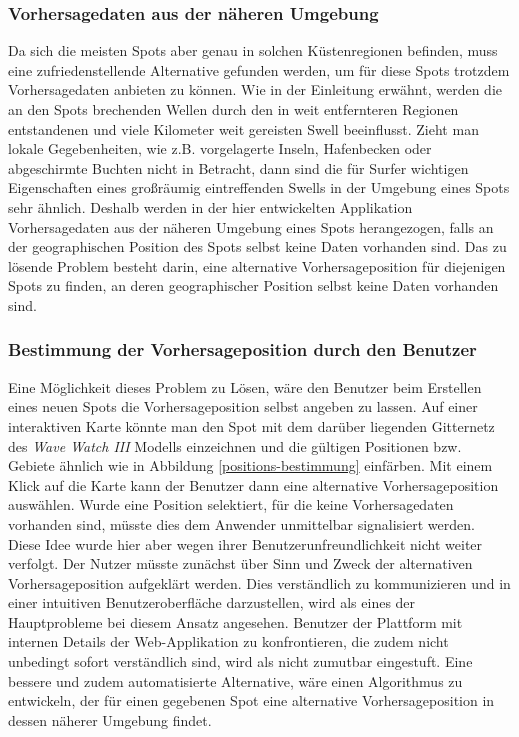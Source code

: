 \subsubsection{Vorhersagedaten aus der näheren Umgebung}
Da sich die meisten Spots aber genau in solchen Küstenregionen
befinden, muss eine zufriedenstellende Alternative gefunden werden, um
für diese Spots trotzdem Vorhersagedaten anbieten zu können. Wie in
der Einleitung erwähnt, werden die an den Spots brechenden Wellen
durch den in weit entfernteren Regionen entstandenen und viele
Kilometer weit gereisten Swell beeinflusst. Zieht man lokale
Gegebenheiten, wie z.B. vorgelagerte Inseln, Hafenbecken oder
abgeschirmte Buchten nicht in Betracht, dann sind die für Surfer
wichtigen Eigenschaften eines großräumig eintreffenden Swells in der
Umgebung eines Spots sehr ähnlich. Deshalb werden in der hier
entwickelten Applikation Vorhersagedaten aus der näheren Umgebung
eines Spots herangezogen, falls an der geographischen Position des
Spots selbst keine Daten vorhanden sind. Das zu lösende Problem
besteht darin, eine alternative Vorhersageposition für diejenigen
Spots zu finden, an deren geographischer Position selbst keine Daten
vorhanden sind.

\subsubsection{Bestimmung der Vorhersageposition durch den Benutzer}
Eine Möglichkeit dieses Problem zu Lösen, wäre den Benutzer beim
Erstellen eines neuen Spots die Vorhersageposition selbst angeben zu
lassen. Auf einer interaktiven Karte könnte man den Spot mit dem
darüber liegenden Gitternetz des \textit{Wave Watch III} Modells
einzeichnen und die gültigen Positionen bzw. Gebiete ähnlich wie in
Abbildung \ref{positions-bestimmung} einfärben. Mit einem Klick auf
die Karte kann der Benutzer dann eine alternative Vorhersageposition
auswählen. Wurde eine Position selektiert, für die keine
Vorhersagedaten vorhanden sind, müsste dies dem Anwender unmittelbar
signalisiert werden. Diese Idee wurde hier aber wegen ihrer
Benutzerunfreundlichkeit nicht weiter verfolgt. Der Nutzer müsste
zunächst über Sinn und Zweck der alternativen Vorhersageposition
aufgeklärt werden. Dies verständlich zu kommunizieren und in einer
intuitiven Benutzeroberfläche darzustellen, wird als eines der
Hauptprobleme bei diesem Ansatz angesehen.  Benutzer der Plattform mit
internen Details der Web-Applikation zu konfrontieren, die zudem nicht
unbedingt sofort verständlich sind, wird als nicht zumutbar
eingestuft. Eine bessere und zudem automatisierte Alternative, wäre
einen Algorithmus zu entwickeln, der für einen gegebenen Spot eine
alternative Vorhersageposition in dessen näherer Umgebung findet.

